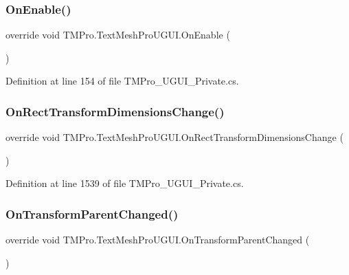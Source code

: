 \subsubsection{\texorpdfstring{OnEnable()}{OnEnable()}}
{\footnotesize\ttfamily override void T\+M\+Pro.\+Text\+Mesh\+Pro\+U\+G\+U\+I.\+On\+Enable (\begin{DoxyParamCaption}{ }\end{DoxyParamCaption})\hspace{0.3cm}{\ttfamily [protected]}}



Definition at line 154 of file T\+M\+Pro\+\_\+\+U\+G\+U\+I\+\_\+\+Private.\+cs.

\mbox{\label{class_t_m_pro_1_1_text_mesh_pro_u_g_u_i_a734589d21ffb7d2ef913b96173b0f432}} 
\subsubsection{\texorpdfstring{OnRectTransformDimensionsChange()}{OnRectTransformDimensionsChange()}}
{\footnotesize\ttfamily override void T\+M\+Pro.\+Text\+Mesh\+Pro\+U\+G\+U\+I.\+On\+Rect\+Transform\+Dimensions\+Change (\begin{DoxyParamCaption}{ }\end{DoxyParamCaption})\hspace{0.3cm}{\ttfamily [protected]}}



Definition at line 1539 of file T\+M\+Pro\+\_\+\+U\+G\+U\+I\+\_\+\+Private.\+cs.

\mbox{\label{class_t_m_pro_1_1_text_mesh_pro_u_g_u_i_a2234b62a5f2bf5fe521e811c5ec4441a}} 
\subsubsection{\texorpdfstring{OnTransformParentChanged()}{OnTransformParentChanged()}}
{\footnotesize\ttfamily override void T\+M\+Pro.\+Text\+Mesh\+Pro\+U\+G\+U\+I.\+On\+Transform\+Parent\+Changed (\begin{DoxyParamCaption}{ }\end{DoxyParamCaption})\hspace{0.3cm}{\ttfamily [protected]}}



